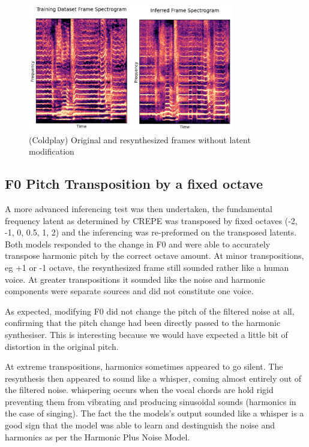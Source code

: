 \begin{figure}[H]
    \centering
    \includegraphics[width=0.8\textwidth]{research/results/Coldplay/InferredRecreation.png}
    \caption{(Coldplay) Original and resynthesized frames without latent modification}
\end{figure}

\subsection{F0 Pitch Transposition by a fixed octave}

A more advanced inferencing test was then undertaken, the fundamental frequency latent as determined by CREPE was transposed by fixed octaves (-2, -1, 0, 0.5, 1, 2) and the inferencing was re-preformed on the transposed latents. Both models responded to the change in F0 and were able to accurately transpose harmonic pitch by the correct octave amount. At minor transpositions, eg +1 or -1 octave, the resynthesized frame still sounded rather like a human voice. At greater transpositions it sounded like the noise and harmonic components were separate sources and did not constitute one voice.

As expected, modifying F0 did not change the pitch of the filtered noise at all, confirming that the pitch change had been directly passed to the harmonic synthesiser. This is interesting because we would have expected a little bit of distortion in the original pitch.

At extreme transpositions, harmonics sometimes appeared to go silent. The resynthesis then appeared to sound like a whisper, coming almost entirely out of the filtered noise. whispering occurs when the vocal chords are hold rigid preventing them from vibrating and producing sinusoidal sounds (harmonics in the case of singing). The fact the the models's output sounded like a whisper is a good sign that the model was able to learn and destinguish the noise and harmonics as per the Harmonic Plus Noise Model\cite{HarmonicPlusNoise}\cite{OriginalDDSP}.

